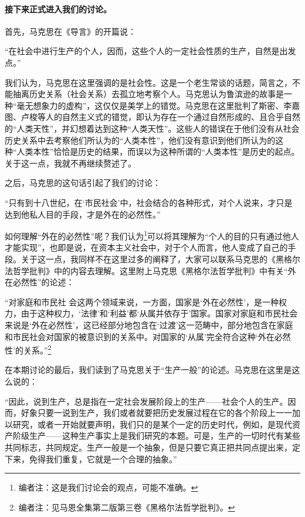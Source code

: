 \documentclass[a4paper,twoside,12pt,AutoFakeBold]{ctexart}
\begin{document}
\paragraph{接下来正式进入我们的讨论。}首先，马克思在《导言》的开篇说：

\begin{adjustwidth}{2em}{2em}
    \qquad\fangsong
    “在社会中进行生产的个人，因而，这些个人的一定社会性质的生产，自然是出发点。”
\end{adjustwidth}

我们认为，马克思在这里强调的是社会性。这是一个老生常谈的话题，简言之，不能抽离历史关系（社会关系）去孤立地考察个人。马克思认为鲁滨逊的故事是一种“毫无想象力的虚构”，这仅仅是美学上的错觉。马克思在这里批判了斯密、李嘉图、卢梭等人的自然主义式的错觉，即认为存在一个通过自然形成的、且合乎自然的“人类天性”，并幻想着达到这种“人类天性”。这些人的错误在于他们没有从社会历史关系中去考察他们所认为的“人类本性”，他们没有意识到他们所认为的这种“人类本性”恰恰是历史的结果，而误以为这种所谓的“人类本性”是历史的起点。关于这一点，我就不再继续赘述了。
\vspace{0.2cm}

之后，马克思的这句话引起了我们的讨论：
\vspace{0.2cm}
\begin{adjustwidth}{2em}{2em}
    \qquad\fangsong
    “只有到十八世纪，在‘市民社会’中，社会结合的各种形式，对个人说来，才只是达到他私人目的手段，才是外在的必然性。”
\end{adjustwidth}
\vspace{0.3cm}

如何理解“外在的必然性”呢？我们认为\footnote{编者注：这是我们讨论会的观点，可能不准确。}可以将其理解为“个人的目的只有通过他人才能实现”，也即是说，在资本主义社会中，对于个人而言，他人变成了自己的手段。关于这一点，我同样不在这里过多的阐释了，大家可以联系马克思的《黑格尔法哲学批判》中的内容去理解。这里附上马克思《黑格尔法哲学批判》中有关“外在必然性”的论述：
\begin{adjustwidth}{2em}{2em}
    \qquad\fangsong
“对家庭和市民社 会这两个领域来说，一方面，国家是‘外在必然性’，是一种权力，由于这种权力，‘法律’和‘利益’都‘从属并依存于’国家。国家对家庭和市民社会来说是‘外在必然性’，这已经部分地包含在‘过渡’这一范畴中，部分地包含在家庭和市民社会对国家的被意识到的关系中。对国家的‘从属’完全符合这种‘外在必然性’的关系。”\footnote{编者注：见马恩全集第二版第三卷《黑格尔法哲学批判》。}
    
\end{adjustwidth}

\vspace{0.3cm}
在本期讨论的最后，我们读到了马克思关于“生产一般”的论述。马克思在这里是这么说的：
\begin{adjustwidth}{2em}{2em}
    \qquad\fangsong
    “因此，说到生产，总是指在一定社会发展阶段上的生产——社会个人的生产。因而，好象只要一说到生产，我们或者就要把历史发展过程在它的各个阶段上一一加以研究，或者一开始就要声明，我们只的是某个一定的历史时代，例如，是现代资产阶级生产——这种生产事实上是我们研究的本题。可是，生产的一切时代有某些共同标志，共同规定。生产一般是一个抽象，但是只要它真正把共同点提出来，定下来，免得我们重复，它就是一个合理的抽象。”
\end{adjustwidth}
\end{document}
